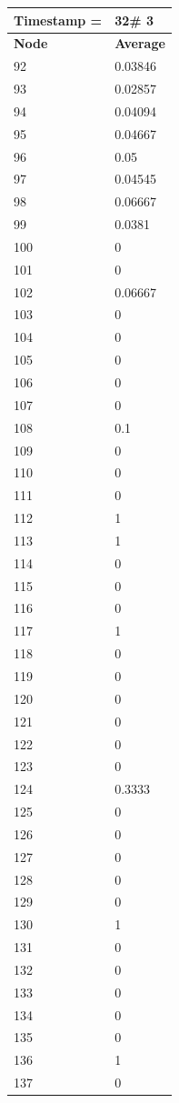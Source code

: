 \begin{tabular}{|l||l|}
\hline
\textbf{Timestamp =} & \textbf{32}\# 3\\\hline
	\textbf{Node} & \textbf{Average} \\ \hline
\hline
	92 & 0.03846 \\ \hline
	93 & 0.02857 \\ \hline
	94 & 0.04094 \\ \hline
	95 & 0.04667 \\ \hline
	96 & 0.05 \\ \hline
	97 & 0.04545 \\ \hline
	98 & 0.06667 \\ \hline
	99 & 0.0381 \\ \hline
	100 & 0 \\ \hline
	101 & 0 \\ \hline
	102 & 0.06667 \\ \hline
	103 & 0 \\ \hline
	104 & 0 \\ \hline
	105 & 0 \\ \hline
	106 & 0 \\ \hline
	107 & 0 \\ \hline
	108 & 0.1 \\ \hline
	109 & 0 \\ \hline
	110 & 0 \\ \hline
	111 & 0 \\ \hline
	112 & 1 \\ \hline
	113 & 1 \\ \hline
	114 & 0 \\ \hline
	115 & 0 \\ \hline
	116 & 0 \\ \hline
	117 & 1 \\ \hline
	118 & 0 \\ \hline
	119 & 0 \\ \hline
	120 & 0 \\ \hline
	121 & 0 \\ \hline
	122 & 0 \\ \hline
	123 & 0 \\ \hline
	124 & 0.3333 \\ \hline
	125 & 0 \\ \hline
	126 & 0 \\ \hline
	127 & 0 \\ \hline
	128 & 0 \\ \hline
	129 & 0 \\ \hline
	130 & 1 \\ \hline
	131 & 0 \\ \hline
	132 & 0 \\ \hline
	133 & 0 \\ \hline
	134 & 0 \\ \hline
	135 & 0 \\ \hline
	136 & 1 \\ \hline
	137 & 0 \\ \hline
\end{tabular}


